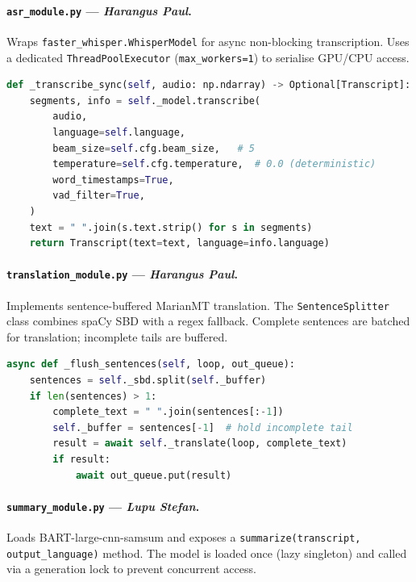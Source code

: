 \documentclass[12pt,a4paper]{report}
\begin{document}
\paragraph{\texttt{asr\_module.py} — \textit{Harangus Paul}.}
Wraps \texttt{faster\_whisper.WhisperModel} for async non-blocking
transcription. Uses a dedicated \texttt{ThreadPoolExecutor}
(\texttt{max\_workers=1}) to serialise GPU/CPU access.

\begin{lstlisting}[language=Python, caption={Core transcription method.}]
def _transcribe_sync(self, audio: np.ndarray) -> Optional[Transcript]:
    segments, info = self._model.transcribe(
        audio,
        language=self.language,
        beam_size=self.cfg.beam_size,   # 5
        temperature=self.cfg.temperature,  # 0.0 (deterministic)
        word_timestamps=True,
        vad_filter=True,
    )
    text = " ".join(s.text.strip() for s in segments)
    return Transcript(text=text, language=info.language)
\end{lstlisting}

\paragraph{\texttt{translation\_module.py} — \textit{Harangus Paul}.}
Implements sentence-buffered MarianMT translation. The
\texttt{SentenceSplitter} class combines spaCy SBD with a regex
fallback. Complete sentences are batched for translation; incomplete
tails are buffered.

\begin{lstlisting}[language=Python, caption={Sentence-boundary-aware translation flush.}]
async def _flush_sentences(self, loop, out_queue):
    sentences = self._sbd.split(self._buffer)
    if len(sentences) > 1:
        complete_text = " ".join(sentences[:-1])
        self._buffer = sentences[-1]  # hold incomplete tail
        result = await self._translate(loop, complete_text)
        if result:
            await out_queue.put(result)
\end{lstlisting}

\paragraph{\texttt{summary\_module.py} — \textit{Lupu Stefan}.}
Loads BART-large-cnn-samsum and exposes a \texttt{summarize(transcript,
output\_language)} method. The model is loaded once (lazy singleton)
and called via a generation lock to prevent concurrent access.
\end{document}
